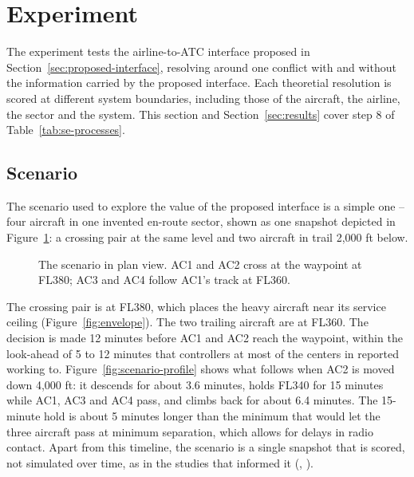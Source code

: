 \section{Experiment}
\label{sec:experiment}


The experiment tests the airline-to-ATC interface proposed in Section~\ref{sec:proposed-interface}, resolving around one conflict with and without the information carried by the proposed interface. Each theoretial resolution is scored at different system boundaries, including those of the aircraft, the airline, the sector and the system. This section and Section~\ref{sec:results} cover step 8 of Table~\ref{tab:se-processes}.

\subsection{Scenario}
\label{sec:scenario}

The scenario used to explore the value of the proposed interface is a simple one -- four aircraft in one invented en-route sector, shown as one snapshot depicted in Figure~\ref{fig:scenario-plan}: a crossing pair at the same level and two aircraft in trail 2,000 ft below. 

\begin{figure}[htbp]
\centering
{}
\caption{The scenario in plan view. AC1 and AC2 cross at the waypoint at FL380; AC3 and AC4 follow AC1's track at FL360.}
\label{fig:scenario-plan}
\end{figure}

The crossing pair is at FL380, which places the heavy aircraft near its service ceiling (Figure~\ref{fig:envelope}). The two trailing aircraft are at FL360. The decision is made 12 minutes before AC1 and AC2 reach the waypoint, within the look-ahead of 5 to 12 minutes that controllers at most of the centers in \textcite{kirwan2001coraStrategies} reported working to. Figure~\ref{fig:scenario-profile} shows what follows when AC2 is moved down 4,000 ft: it descends for about 3.6 minutes, holds FL340 for 15 minutes while AC1, AC3 and AC4 pass, and climbs back for about 6.4 minutes. The 15-minute hold is about 5 minutes longer than the minimum that would let the three aircraft pass at minimum separation, which allows for delays in radio contact. Apart from this timeline, the scenario is a single snapshot that is scored, not simulated over time, as in the studies that informed it (\cite{kirwan2001coraStrategies}, \cite{fothergill2013resolutionHeuristics}).

